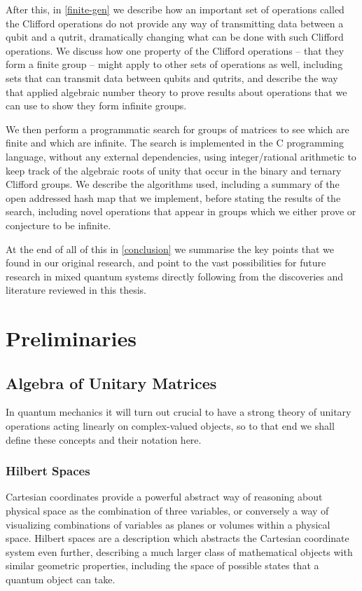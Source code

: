 After this, in \autoref{finite-gen} we describe how an important set of operations called the Clifford operations do not provide any way of transmitting data between a qubit and a qutrit, dramatically changing what can be done with such Clifford operations. We discuss how one property of the Clifford operations -- that they form a finite group -- might apply to other sets of operations as well, including sets that can transmit data between qubits and qutrits, and describe the way that \cite{universal-qubit} applied algebraic number theory to prove results about operations that we can use to show they form infinite groups.

We then perform a programmatic search for groups of matrices to see which are finite and which are infinite. The search is implemented in the C programming language, without any external dependencies, using integer/rational arithmetic to keep track of the algebraic roots of unity that occur in the binary and ternary Clifford groups. We describe the algorithms used, including a summary of the open addressed hash map that we implement, before stating the results of the search, including novel operations that appear in groups which we either prove or conjecture to be infinite.

At the end of all of this in \autoref{conclusion} we summarise the key points that we found in our original research, and point to the vast possibilities for future research in mixed quantum systems directly following from the discoveries and literature reviewed in this thesis.

\chapter[PRELIMINARIES]{Preliminaries}\label{preliminaries}
\section{Algebra of Unitary Matrices}
In quantum mechanics it will turn out crucial to have a strong theory of unitary operations acting linearly on complex-valued objects, so to that end we shall define these concepts and their notation here.
\subsection{Hilbert Spaces}\label{hilbert-space}
Cartesian coordinates provide a powerful abstract way of reasoning about physical space as the combination of three variables, or conversely a way of visualizing combinations of variables as planes or volumes within a physical space. Hilbert spaces are a description which abstracts the Cartesian coordinate system even further, describing a much larger class of mathematical objects with similar geometric properties, including the space of possible states that a quantum object can take.

